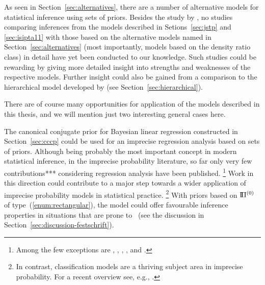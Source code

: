 As seen in Section~\ref{sec:alternatives}, there are a number of alternative models
for statistical inference using sets of priors.
Besides the study by \textcite{2011:krautenbacher},
no studies comparing inferences from the models described in Setions~\ref{sec:jstp} and \ref{sec:isipta11}
with those based on the alternative models named in Section~\ref{sec:alternatives}
(most importantly, models based on the density ratio class)
in detail have yet been conducted to our knowledge.
Such studies could be rewarding
by giving more detailed insight into strengths and weaknesses of the respective models.
Further insight could also be gained from a comparison to the hierarchical model
developed by \textcite{2008:cattaneo} (see Section~\ref{sec:hierarchical}).

There are of course many opportunities for application of the models described in this thesis,
and we will mention just two interesting general cases here.

The canonical conjugate prior for Bayesian linear regression constructed in Section~\ref{sec:cccp}
could be used for an imprecise regression analysis based on sets of priors.
Although being probably the most important concept in modern statistical inference,
in the imprecise probability literature,
so far only very few contributions*** considering regression analysis have been published.%
\footnote{Among the few exceptions are \textcite{Walter2007a}, \textcite{2010:utkin},
\textcite{2011:utkin}, \textcite{2012:cattaneo-wiencierz}, and \textcite{2013:utkin-wiencierz}.}
Work in this direction could contribute to a major step towards a wider application
of imprecise probability models in statistical practice.%
\footnote{In contrast, classification models are a thriving subject area in imprecise probability.
For a recent overview see, e.g., \textcite{itip-classification}.}
With priors based on $\text{I}\!\Pi^{(0)}$ of type~(\ref{enum:rectangular}),
the model could offer favourable inference properties in situations that are prone to \pdc\
(see the discussion in Section~\ref{sec:discussion-festschrift}).

